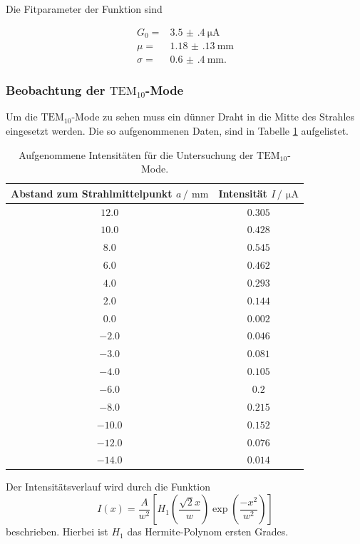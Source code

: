 Die Fitparameter der Funktion sind

\begin{align*}
  G_{0}=&\SI{3.5(4)}{\micro\ampere}\\
  \mu =& \SI{1.18(13)}{\milli\meter}\\
  \sigma =& \SI{0.6(4)}{\milli\meter}.
\end{align*}

\subsubsection{Beobachtung der \texorpdfstring{$\text{TEM}_{10}$}{T1}-Mode}

Um die $\text{TEM}_{10}$-Mode zu sehen muss ein dünner Draht in die Mitte des Strahles eingesetzt werden. Die 
so aufgenommenen Daten, sind in Tabelle \ref{tab:TEM01} aufgelistet.

\begin{table}
  \centering
  \caption{Aufgenommene Intensitäten für die Untersuchung der $\text{TEM}_{10}$-Mode.}
  \label{tab:TEM01}
  \begin{tabular}{c c}
    \toprule
    Abstand zum Strahlmittelpunkt $a\,/\,\SI{}{\milli\meter}$&Intensität $I \,/\,\SI{}{\micro\ampere}$\\
    \midrule
    $\num{12.0}$&$\num{0.305}$\\
    $\num{10.0}$&$\num{0.428}$\\
    $\num{8.0}$&$\num{0.545}$\\
    $\num{6.0}$&$\num{0.462}$\\
    $\num{4.0}$&$\num{0.293}$\\
    $\num{2.0}$&$\num{0.144}$\\
    $\num{0.0}$&$\num{0.002}$\\
    $\num{-2.0}$&$\num{0.046}$\\
    $\num{-3.0}$&$\num{0.081}$\\
    $\num{-4.0}$&$\num{0.105}$\\
    $\num{-6.0}$&$\num{0.2}$\\
    $\num{-8.0}$&$\num{0.215}$\\
    $\num{-10.0}$&$\num{0.152}$\\
    $\num{-12.0}$&$\num{0.076}$\\
    $\num{-14.0}$&$\num{0.014}$\\
    \bottomrule
  \end{tabular}
\end{table}
\FloatBarrier

Der Intensitätsverlauf wird durch die Funktion
\begin{equation*}
  I(x)=\frac{A}{w^2}\left[H_{1}\left(\frac{\sqrt{2}x}{w}\right)\exp{\left(\frac{-x^2}{w^2}\right)}\right]
\end{equation*}
beschrieben. Hierbei ist $H_{1}$ das Hermite-Polynom ersten Grades.

